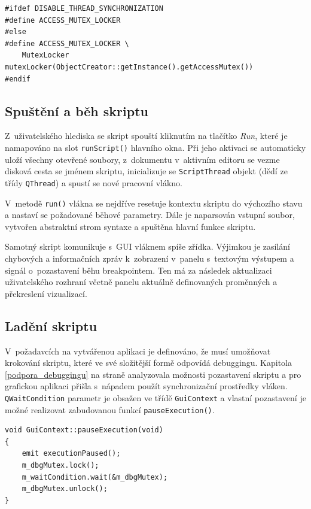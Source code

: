 \documentclass[11pt,twoside,a4paper]{book}
\begin{document}
\begin{verbatim}
#ifdef DISABLE_THREAD_SYNCHRONIZATION
#define ACCESS_MUTEX_LOCKER
#else
#define ACCESS_MUTEX_LOCKER \
    MutexLocker mutexLocker(ObjectCreator::getInstance().getAccessMutex())
#endif
\end{verbatim}


\subsection{Spuštění a běh skriptu}

Z~uživatelského hlediska se skript spouští kliknutím na tlačítko \textit{Run}, které je namapováno na slot \texttt{runScript()} hlavního okna. Při jeho aktivaci se automaticky uloží všechny otevřené soubory, z~dokumentu v~aktivním editoru se vezme disková cesta se jménem skriptu, inicializuje se \texttt{ScriptThread} objekt (dědí ze třídy \texttt{QThread}) a spustí se nové pracovní vlákno.

V~metodě \texttt{run()} vlákna se nejdříve resetuje kontextu skriptu do výchozího stavu a nastaví se požadované běhové parametry. Dále je naparsován vstupní soubor, vytvořen abstraktní strom syntaxe a spuštěna hlavní funkce skriptu.

Samotný skript komunikuje s~GUI vláknem spíše zřídka. Výjimkou je zasílání chybových a informačních zpráv k~zobrazení v~panelu s~textovým výstupem a signál o~pozastavení běhu breakpointem. Ten má za následek aktualizaci uživatelského rozhraní včetně panelu aktuálně definovaných proměnných a překreslení vizualizací.


\subsection{Ladění skriptu}

V~požadavcích na vytvářenou aplikaci je definováno, že musí umožňovat krokování skriptu, které ve své složitější formě odpovídá debuggingu. Kapitola \ref{podpora_debuggingu} na straně \pageref{podpora_debuggingu} analyzovala možnosti pozastavení skriptu a pro grafickou aplikaci přišla s~nápadem použít synchronizační prostředky vláken. \texttt{QWaitCondition} parametr je obsažen ve třídě \texttt{GuiContext} a vlastní pozastavení je možné realizovat zabudovanou funkcí \texttt{pauseExecution()}.

\begin{verbatim}
void GuiContext::pauseExecution(void)
{
    emit executionPaused();
    m_dbgMutex.lock();
    m_waitCondition.wait(&m_dbgMutex);
    m_dbgMutex.unlock();
}
\end{verbatim}
\end{document}
